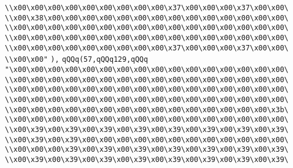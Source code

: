 \verb|\\x00\x00\x00\x00\x00\x00\x00\x00\x00\x37\x00\x00\x00\x37\x00\x00\|\newline
\verb|\\x00\x38\x00\x00\x00\x00\x00\x00\x00\x00\x00\x00\x00\x00\x00\x00\|\newline
\verb|\\x00\x00\x00\x00\x00\x00\x00\x00\x00\x00\x00\x00\x00\x00\x00\x00\|\newline
\verb|\\x00\x00\x00\x00\x00\x00\x00\x00\x00\x00\x00\x00\x00\x00\x00\x00\|\newline
\verb|\\x00\x00\x00\x00\x00\x00\x00\x00\x00\x37\x00\x00\x00\x37\x00\x00\|\newline
\verb|\\x00\x00"|\newline
\verb|),|\newline
\verb|qQQq(57,qQQq129,qQQq|\newline
\verb|"\x00\x00\x00\x00\x00\x00\x00\x00\x00\x00\x00\x00\x00\x00\x00\x00\|\newline
\verb|\\x00\x00\x00\x00\x00\x00\x00\x00\x00\x00\x00\x00\x00\x00\x00\x00\|\newline
\verb|\\x00\x00\x00\x00\x00\x00\x00\x00\x00\x00\x00\x00\x00\x00\x00\x00\|\newline
\verb|\\x00\x00\x00\x00\x00\x00\x00\x00\x00\x00\x00\x00\x00\x00\x00\x00\|\newline
\verb|\\x00\x00\x00\x00\x00\x00\x00\x00\x00\x00\x00\x00\x00\x00\x00\x3b\|\newline
\verb|\\x00\x00\x00\x00\x00\x00\x00\x00\x00\x00\x00\x00\x00\x00\x00\x00\|\newline
\verb|\\x00\x39\x00\x39\x00\x39\x00\x39\x00\x39\x00\x39\x00\x39\x00\x39\|\newline
\verb|\\x00\x39\x00\x39\x00\x00\x00\x00\x00\x00\x00\x00\x00\x00\x00\x00\|\newline
\verb|\\x00\x00\x00\x39\x00\x39\x00\x39\x00\x39\x00\x39\x00\x39\x00\x39\|\newline
\verb|\\x00\x39\x00\x39\x00\x39\x00\x39\x00\x39\x00\x39\x00\x39\x00\x39\|\newline
